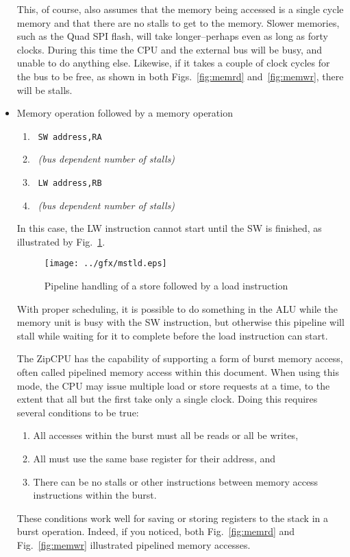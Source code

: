 \documentclass{gqtekspec}
\begin{document}
\begin{itemize}
This, of course, also assumes that the memory being accessed is a single cycle
memory and that there are no stalls to get to the memory.
Slower memories, such as the Quad SPI flash, will take longer--perhaps even
as long as forty clocks.   During this time the CPU and the external bus 
will be busy, and unable to do anything else.  Likewise, if it takes a couple
of clock cycles for the bus to be free, as shown in both Figs.~\ref{fig:memrd}
and~\ref{fig:memwr}, there will be stalls.

\item Memory operation followed by a memory operation
\begin{enumerate}
\item\ {\tt SW address,RA}
\item\ {\em (bus dependent number of stalls)}
\item\ {\tt LW address,RB}
\item\ {\em (bus dependent number of stalls)}
\end{enumerate}

	In this case, the LW instruction cannot start until the SW is finished,
	as illustrated by Fig.~\ref{fig:mstld}.
\begin{figure}\begin{center}
\texttt{[image: ../gfx/mstld.eps]}
\caption{Pipeline handling of a store followed by a load instruction}\label{fig:mstld}
\end{center}\end{figure}
	With proper scheduling, it is possible to do something in the ALU
	while the memory unit is busy with the SW instruction, but otherwise
	this pipeline will stall while waiting for it to complete before the
	load instruction can start.

	The ZipCPU has the capability of supporting a form of burst memory
	access, often called pipelined memory access within this document.
	When using this mode, the CPU may issue multiple load or store requests
	at a time, to the extent that all but the first take only a single
	clock.  Doing this requires several conditions to be true:
\begin{enumerate}
\item All accesses within the burst must all be reads or all be writes,
\item All must use the same base register for their address, and
\item There can be no stalls or other instructions between memory
	access instructions within the burst. 
\end{enumerate}
	These conditions work well for saving or storing registers to the stack
	in a burst operation.  Indeed, if you noticed, both
	Fig.~\ref{fig:memrd} and Fig.~\ref{fig:memwr} illustrated pipelined
	memory accesses.
\end{itemize}
\fi
\end{document}
